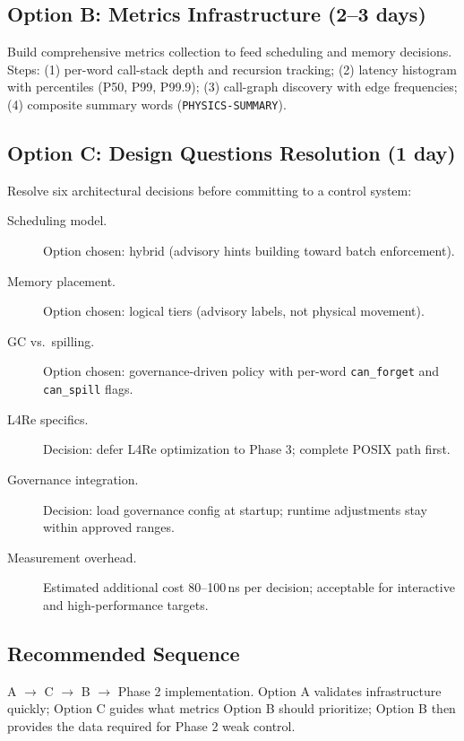 \subsection{Option B: Metrics Infrastructure (2--3 days)}

Build comprehensive metrics collection to feed scheduling and memory decisions.
Steps: (1) per-word call-stack depth and recursion tracking; (2) latency
histogram with percentiles (P50, P99, P99.9); (3) call-graph discovery with
edge frequencies; (4) composite summary words (\texttt{PHYSICS-SUMMARY}).

\subsection{Option C: Design Questions Resolution (1 day)}

Resolve six architectural decisions before committing to a control system:

\begin{description}
  \item[Scheduling model.] Option chosen: hybrid (advisory hints building
        toward batch enforcement).
  \item[Memory placement.] Option chosen: logical tiers (advisory labels,
        not physical movement).
  \item[GC vs.\ spilling.] Option chosen: governance-driven policy with
        per-word \texttt{can\_forget} and \texttt{can\_spill} flags.
  \item[L4Re specifics.] Decision: defer L4Re optimization to Phase 3;
        complete POSIX path first.
  \item[Governance integration.] Decision: load governance config at
        startup; runtime adjustments stay within approved ranges.
  \item[Measurement overhead.] Estimated additional cost 80--100\,ns per
        decision; acceptable for interactive and high-performance targets.
\end{description}

\subsection{Recommended Sequence}

A $\to$ C $\to$ B $\to$ Phase 2 implementation. Option A validates
infrastructure quickly; Option C guides what metrics Option B should
prioritize; Option B then provides the data required for Phase 2 weak
control.
